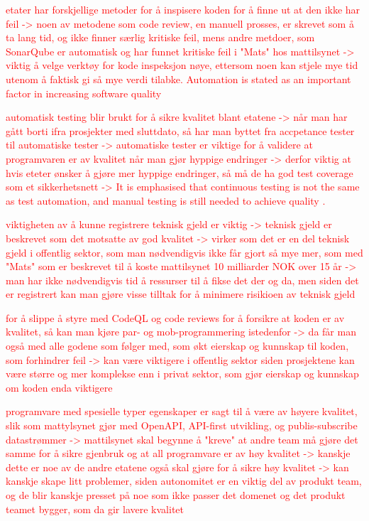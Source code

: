 \textcolor{red}{etater har forskjellige metoder for å inspisere koden for å finne ut at den ikke har feil -> noen av metodene som code review, en manuell prosses, er skrevet som å ta lang tid, og ikke finner særlig kritiske feil, mens andre metdoer, som SonarQube er automatisk og har funnet kritiske feil i "Mats" hos mattilsynet -> viktig å velge verktøy for kode inspeksjon nøye, ettersom noen kan stjele mye tid utenom å faktisk gi så mye verdi tilabke. Automation is stated as an important factor in increasing software quality \cite{smm_2018}}

\textcolor{red}{automatisk testing blir brukt for å sikre kvalitet blant etatene -> når man har gått borti ifra prosjekter med sluttdato, så har man byttet fra accpetance tester til automatiske tester -> automatiske tester er viktige for å validere at programvaren er av kvalitet når man gjør hyppige endringer -> derfor viktig at hvis eteter ønsker å gjøre mer hyppige endringer, så må de ha god test coverage som et sikkerhetsnett -> It is emphasised that continuous testing is not the same as test automation, and manual testing is still needed to achieve quality \cite{dsc_2019}.}

\textcolor{red}{viktigheten av å kunne registrere teknisk gjeld er viktig -> teknisk gjeld er beskrevet som det motsatte av god kvalitet -> virker som det er en del teknisk gjeld i offentlig sektor, som man nødvendigvis ikke får gjort så mye mer, som med "Mats" som er beskrevet til å koste mattilsynet 10 milliarder NOK over 15 år -> man har ikke nødvendigvis tid å ressurser til å fikse det der og da, men siden det er registrert kan man gjøre visse tilltak for å minimere risikioen av teknisk gjeld}

\textcolor{red}{for å slippe å styre med CodeQL og code reviews for å forsikre at koden er av kvalitet, så kan man kjøre par- og mob-programmering istedenfor -> da får man også med alle godene som følger med, som økt eierskap og kunnskap til koden, som forhindrer feil -> kan være viktigere i offentlig sektor siden prosjektene kan være større og mer komplekse enn i privat sektor, som gjør eierskap og kunnskap om koden enda viktigere}

\textcolor{red}{programvare med spesielle typer egenskaper er sagt til å være av høyere kvalitet, slik som mattylsynet gjør med OpenAPI, API-first utvikling, og publis-subscribe datastrømmer -> mattilsynet skal begynne å "kreve" at andre team må gjøre det samme for å sikre gjenbruk og at all programvare er av høy kvalitet -> kanskje dette er noe av de andre etatene også skal gjøre for å sikre høy kvalitet -> kan kanskje skape litt problemer, siden autonomitet er en viktig del av produkt team, og de blir kanskje presset på noe som ikke passer det domenet og det produkt teamet bygger, som da gir lavere kvalitet}


